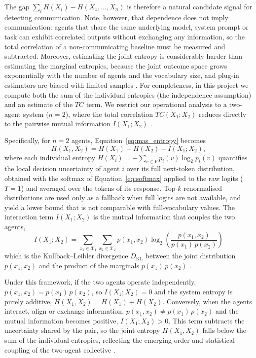 The gap $\sum_i H(X_i) - H(X_1, \ldots, X_n)$ is therefore a natural candidate signal for detecting communication. Note, however, that dependence does not imply communication: agents that share the same underlying model, system prompt or task can exhibit correlated outputs without exchanging any information, so the total correlation of a non-communicating baseline must be measured and subtracted. Moreover, estimating the joint entropy is considerably harder than estimating the marginal entropies, because the joint outcome space grows exponentially with the number of agents and the vocabulary size, and plug-in estimators are biased with limited samples \parencite{paninski2003estimation}. For completeness, in this project we compute both the sum of the individual entropies (the independence assumption) and an estimate of the $TC$ term. We restrict our operational analysis to a two-agent system ($n = 2$), where the total correlation $TC(X_1; X_2)$ reduces directly to the pairwise mutual information $I(X_1; X_2)$ \parencite{cover2006elements}.

Specifically, for $n = 2$ agents, Equation~\eqref{eq:mas_entropy} becomes
\begin{equation}
  H(X_1, X_2) = H(X_1) + H(X_2) - I(X_1; X_2),
  \label{eq:gibbs_shannon_two_agents}
\end{equation}
where each individual entropy $H(X_i) = -\sum_{v \in V} p_i(v) \log_2 p_i(v)$ quantifies the local decision uncertainty of agent $i$ over its full next-token distribution, obtained with the softmax of Equation~\eqref{eq:softmax} applied to the raw logits ($T = 1$) and averaged over the tokens of its response. Top-$k$ renormalised distributions are used only as a fallback when full logits are not available, and yield a lower bound that is not comparable with full-vocabulary values. The interaction term $I(X_1; X_2)$ is the mutual information that couples the two agents,
\begin{equation}
  I(X_1; X_2) = \sum_{x_1 \in \mathcal{X}_1} \sum_{x_2 \in \mathcal{X}_2} p(x_1, x_2) \log_2 \left( \frac{p(x_1, x_2)}{p(x_1)\, p(x_2)} \right)
  \label{eq:mutual_information}
\end{equation}
which is the Kullback--Leibler divergence $D_{\mathrm{KL}}$ between the joint distribution $p(x_1, x_2)$ and the product of the marginals $p(x_1)\,p(x_2)$ \parencite{cover2006elements}.

Under this framework, if the two agents operate independently, $p(x_1, x_2) = p(x_1)\,p(x_2)$, so $I(X_1; X_2) = 0$ and the system entropy is purely additive, $H(X_1, X_2) = H(X_1) + H(X_2)$. Conversely, when the agents interact, align or exchange information, $p(x_1, x_2) \neq p(x_1)\,p(x_2)$ and the mutual information becomes positive, $I(X_1; X_2) > 0$. This term subtracts the uncertainty shared by the pair, so the joint entropy $H(X_1, X_2)$ falls below the sum of the individual entropies, reflecting the emerging order and statistical coupling of the two-agent collective \parencite{cover2006elements, watanabe1960}.
